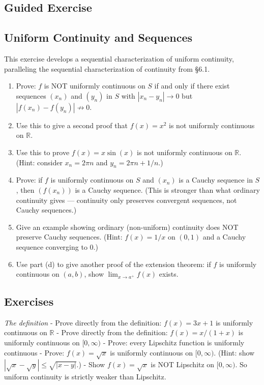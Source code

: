\documentclass[
  10pt,
  letterpaper,
]{scrbook}
\newcommand{\RR}{\mathbb{R}}
\begin{document}
\subsection{Guided Exercise}\label{guided-exercise-14}

\subsection{Uniform Continuity and
Sequences}\label{uniform-continuity-and-sequences}

This exercise develops a sequential characterization of uniform
continuity, paralleling the sequential characterization of continuity
from §6.1.

\begin{enumerate}
\def\labelenumi{(\alph{enumi})}
\item
  Prove: \(f\) is NOT uniformly continuous on \(S\) if and only if there
  exist sequences \((x_n)\) and \((y_n)\) in \(S\) with
  \(|x_n - y_n| \to 0\) but \(|f(x_n) - f(y_n)| \not\to 0\).
\item
  Use this to give a second proof that \(f(x) = x^2\) is not uniformly
  continuous on \(\RR\).
\item
  Use this to prove \(f(x) = x \sin(x)\) is not uniformly continuous on
  \(\RR\). (Hint: consider \(x_n = 2\pi n\) and \(y_n = 2\pi n + 1/n\).)
\item
  Prove: if \(f\) is uniformly continuous on \(S\) and \((x_n)\) is a
  Cauchy sequence in \(S\), then \((f(x_n))\) is a Cauchy sequence.
  (This is stronger than what ordinary continuity gives --- continuity
  only preserves convergent sequences, not Cauchy sequences.)
\item
  Give an example showing ordinary (non-uniform) continuity does NOT
  preserve Cauchy sequences. (Hint: \(f(x) = 1/x\) on \((0,1)\) and a
  Cauchy sequence converging to \(0\).)
\item
  Use part (d) to give another proof of the extension theorem: if \(f\)
  is uniformly continuous on \((a,b)\), show \(\lim_{x \to a^+} f(x)\)
  exists.
\end{enumerate}

\subsection{Exercises}\label{exercises-28}

\emph{The definition} - Prove directly from the definition:
\(f(x) = 3x + 1\) is uniformly continuous on \(\RR\) - Prove directly
from the definition: \(f(x) = x/(1 + x)\) is uniformly continuous on
\([0, \infty)\) - Prove: every Lipschitz function is uniformly
continuous - Prove: \(f(x) = \sqrt{x}\) is uniformly continuous on
\([0, \infty)\). (Hint: show
\(|\sqrt{x} - \sqrt{y}| \leq \sqrt{|x-y|}\).) - Show \(f(x) = \sqrt{x}\)
is NOT Lipschitz on \([0, \infty)\). So uniform continuity is strictly
weaker than Lipschitz.
\end{document}
